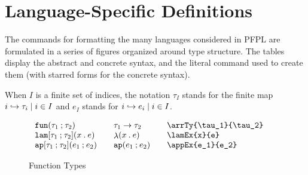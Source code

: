 \documentclass[11pt]{article}
\begin{document}
\section*{Language-Specific Definitions}

The commands for formatting the many languages considered in \textsf{PFPL} are formulated in a series of figures organized around type structure.  The tables display the abstract and concrete syntax, and the literal command used to create them (with starred forms for the concrete syntax).

When $I$ is a finite set of indices, the notation $\tau_I$ stands for the finite map $\finmap{I}{i}{\tau}$ and $e_I$ stands for $\finmap{I}{i}{e}$.

\clearpage

\begin{figure}
  \begin{small}
    \begin{displaymath}
      \begin{array}{l@{\qquad}l@{\qquad}l@{\qquad}l}
        \arrTy{\tau_1}{\tau_2} & \arrTy*{\tau_1}{\tau_2} & \verb|\arrTy{\tau_1}{\tau_2}| \\
        \lamEx{x}{e}           & \lamEx*{x}{e}           & \verb|\lamEx{x}{e}|           \\
        \appEx{e_1}{e_2}       & \appEx*{e_1}{e_2}       & \verb|\appEx{e_1}{e_2}|
      \end{array}
    \end{displaymath}
  \end{small}

  \caption{Function Types}
  \label{fig:function}
\end{figure}
\end{document}
